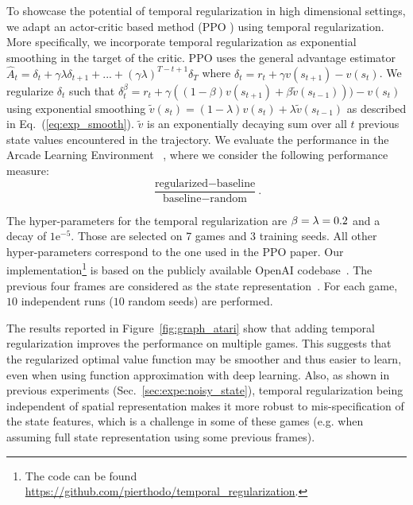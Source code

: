 To showcase the potential of temporal regularization in high dimensional settings, we adapt an actor-critic based method (PPO \citep{schulman2017proximal}) using temporal regularization. More specifically, we incorporate temporal regularization as exponential smoothing in the target of the critic.  PPO uses the general advantage estimator $\hat{A}_t = \delta_t + \gamma \lambda \delta_{t+1} + ... + (\gamma \lambda)^{T-t+1} \delta_{T}$ where $\delta_t = r_t + \gamma v(s_{t+1}) - v(s_{t})$. We regularize $\delta_t$ such that $\delta_t^{\beta} = r_t + \gamma ((1-\beta)v(s_{t+1}) + \beta \widetilde{v}(s_{t-1}))) - v(s_{t})$ using exponential smoothing $\widetilde{v}(s_{t}) = (1-\lambda)v(s_t) + \lambda \widetilde{v}(s_{t-1})$ as described in Eq.~(\ref{eq:exp_smooth}). $\widetilde{v}$ is an exponentially decaying sum over all $t$ previous state values encountered in the trajectory.
We evaluate the performance in the Arcade Learning Environment ~\citep{bellemare2013arcade}, where we consider the following performance measure:
\begin{equation}
\label{eqn:expe:drl_measure}
    \frac{\text{regularized} - \text{baseline}}{\text{baseline} - \text{random}}.
\end{equation}

The hyper-parameters for the temporal regularization are $\beta = \lambda = 0.2$ and a decay of $1\mathrm{e}^{-5}$. Those are selected on 7 games and 3 training seeds. All other hyper-parameters correspond to the one used in the PPO paper. Our implementation\footnote{The code can be found \url{https://github.com/pierthodo/temporal_regularization}.} is based on the publicly available OpenAI codebase~\citep{baselines}. The previous four frames are considered as the state representation~\citep{mnih2015human}.
For each game, $10$ independent runs ($10$ random seeds) are performed. 


The results reported in Figure~\ref{fig:graph_atari} show that adding temporal regularization improves the performance on multiple games. This suggests that the regularized optimal value function may be smoother and thus easier to learn, even when using function approximation with deep learning. Also, as shown in previous experiments (Sec.~\ref{sec:expe:noisy_state}), temporal regularization being independent of spatial representation makes it more robust to mis-specification of the state features, which is a challenge in some of these games (e.g. when assuming full state representation using some previous frames).

